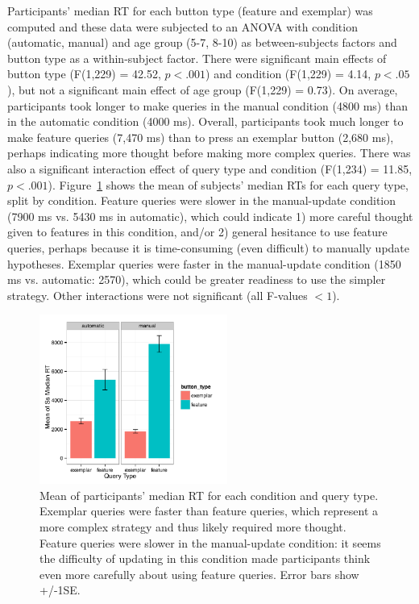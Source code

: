 \documentclass[man,floatsintext]{apa6}
\begin{document}
Participants' median RT for each button type (feature and exemplar) was computed and these data were subjected to an ANOVA with condition (automatic, manual) and age group (5-7, 8-10) as 
between-subjects factors and button type as a within-subject factor. There
were significant main effects of button type (F(1,229) = 42.52, $p<.
001$) and condition (F(1,229) = 4.14, $p<.05$), but not a significant main effect of age group (F(1,229) = 0.73). On average, participants took longer to make queries in the manual 
condition (4800 ms) than in the automatic condition (4000 ms). Overall, participants took much 
longer to make feature queries (7,470 ms) than to press an exemplar button (2,680 ms), 
perhaps indicating more thought before making more complex queries. There was also a significant 
interaction effect of query type and condition (F(1,234) = 11.85, $p<.001$). Figure~\ref{fig:basic-rt} shows 
the mean of subjects' median RTs for each query type, split by condition. Feature queries were 
slower in the manual-update condition (7900 ms vs. 5430 ms in automatic), which could indicate 
1) more careful thought given to features in this condition, and/or 2) general hesitance to use feature 
queries, perhaps because it is time-consuming (even difficult) to manually update hypotheses. 
Exemplar queries were faster in the manual-update condition (1850 ms vs. automatic: 2570),
which could be greater readiness to use the simpler strategy. Other interactions were not significant (all F-values $<1$).

\begin{figure}[h]
  \centering
  \includegraphics[width=0.55\textwidth]{figures/RT_by_condition_query_type}
  \caption{Mean of participants' median RT for each condition and query type. 
Exemplar queries were faster than feature queries, which represent a more complex 
strategy and thus likely required more thought. Feature queries were slower in the 
manual-update condition: it seems the difficulty of updating in this condition made 
participants think even more carefully about using feature queries. Error bars show 
+/-1SE.}
  \label{fig:basic-rt}
\end{figure} 
\end{document}

